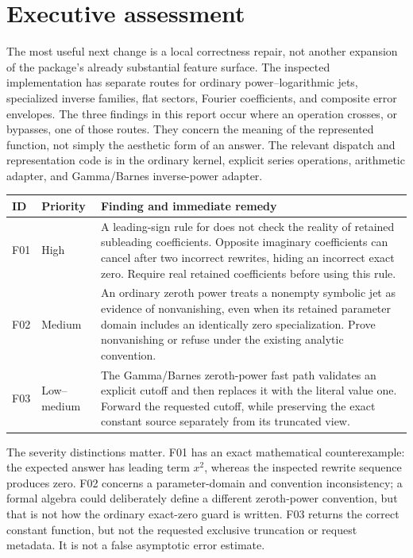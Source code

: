 \documentclass[11pt,letterpaper]{article}
\newcommand{\code}[1]{\texttt{\detokenize{#1}}}
\begin{document}
\begingroup
\small
\setlength{\parskip}{0pt}
\tableofcontents
\endgroup
\newpage

\section{Executive assessment}

The most useful next change is a local correctness repair, not another expansion of the package's already substantial feature surface. The inspected implementation has separate routes for ordinary power--logarithmic jets, specialized inverse families, flat sectors, Fourier coefficients, and composite error envelopes. The three findings in this report occur where an operation crosses, or bypasses, one of those routes. They concern the meaning of the represented function, not simply the aesthetic form of an answer. The relevant dispatch and representation code is in the ordinary kernel, explicit series operations, arithmetic adapter, and Gamma/Barnes inverse-power adapter.\cite{core,operations,arithmetic,gammaops}

\begin{tabularx}{\textwidth}{@{}p{0.45in}p{0.7in}X@{}}
\toprule
ID & Priority & Finding and immediate remedy\\
\midrule
F01 & High & A leading-sign rule for \code{Abs} does not check the reality of retained subleading coefficients. Opposite imaginary coefficients can cancel after two incorrect rewrites, hiding an incorrect exact zero. Require real retained coefficients before using this rule.\\
F02 & Medium & An ordinary zeroth power treats a nonempty symbolic jet as evidence of nonvanishing, even when its retained parameter domain includes an identically zero specialization. Prove nonvanishing or refuse under the existing analytic convention.\\
F03 & Low--medium & The Gamma/Barnes zeroth-power fast path validates an explicit cutoff and then replaces it with the literal value one. Forward the requested cutoff, while preserving the exact constant source separately from its truncated view.\\
\bottomrule
\end{tabularx}

The severity distinctions matter. F01 has an exact mathematical counterexample: the expected answer has leading term $x^2$, whereas the inspected rewrite sequence produces zero. F02 concerns a parameter-domain and convention inconsistency; a formal algebra could deliberately define a different zeroth-power convention, but that is not how the ordinary exact-zero guard is written. F03 returns the correct constant function, but not the requested exclusive truncation or request metadata. It is not a false asymptotic error estimate.
\end{document}

